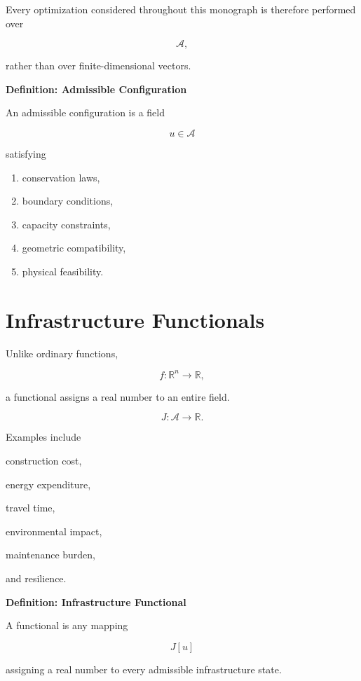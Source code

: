 \documentclass[11pt,fleqn]{book}
\numberwithin{equation}{chapter}
\newenvironment{definition}[1]
  {\begin{definitionEnv}
   \noindent\textbf{Definition: #1}\par\smallskip}
  {\end{definitionEnv}}
\theoremstyle{plain}
\theoremstyle{definition}
\theoremstyle{remark}
\begin{document}
Every optimization considered throughout this monograph is therefore
performed over

\[
\mathcal A,
\]

rather than over finite-dimensional vectors.


\begin{definition}{Admissible Configuration}

An admissible configuration is a field

\[
u\in\mathcal A
\]

satisfying

\begin{enumerate}
\item conservation laws,
\item boundary conditions,
\item capacity constraints,
\item geometric compatibility,
\item physical feasibility.
\end{enumerate}

\end{definition}


\section{Infrastructure Functionals}

Unlike ordinary functions,

\[
f:\mathbb R^n\rightarrow\mathbb R,
\]

a functional assigns a real number to an entire field.

\[
J:
\mathcal A
\rightarrow
\mathbb R.
\]

Examples include

construction cost,

energy expenditure,

travel time,

environmental impact,

maintenance burden,

and resilience.


\begin{definition}{Infrastructure Functional}

A functional is any mapping

\[
J[u]
\]

assigning a real number to every admissible infrastructure state.

\end{definition}
\end{document}
